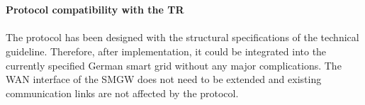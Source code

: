 \\
\\
\textbf{Protocol compatibility with the TR}
\\
\\
The protocol has been designed with the structural specifications of the technical guideline. Therefore, after implementation, it could be integrated into the currently specified German smart grid without any major complications. The WAN interface of the SMGW does not need to be extended and existing communication links are not affected by the protocol. 



\clearpage

